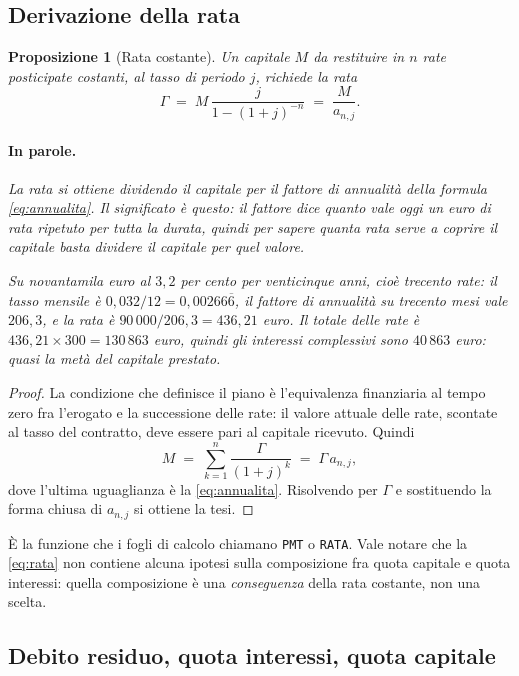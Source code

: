 \documentclass[11pt,a4paper]{article}
\theoremstyle{definition}
\theoremstyle{plain}
\newtheorem{proposizione}[definizione]{Proposizione}
\begin{document}
\subsection{Derivazione della rata}

\begin{proposizione}[Rata costante]
Un capitale $M$ da restituire in $n$ rate posticipate costanti, al tasso di periodo $j$, richiede la rata
\begin{equation}
\Gamma \;=\; M\,\frac{j}{1-(1+j)^{-n}} \;=\; \frac{M}{a_{n,j}} .
\label{eq:rata}
\end{equation}

\paragraph{In parole.} La rata si ottiene dividendo il capitale per il fattore di annualità della formula \eqref{eq:annualita}. Il significato è questo: il fattore dice quanto vale oggi un euro di rata ripetuto per tutta la durata, quindi per sapere quanta rata serve a coprire il capitale basta dividere il capitale per quel valore.

Su novantamila euro al $3{,}2$ per cento per venticinque anni, cioè trecento rate: il tasso mensile è $0{,}032/12 = 0{,}00266\overline{6}$, il fattore di annualità su trecento mesi vale $206{,}3$, e la rata è $90\,000/206{,}3 = 436{,}21$ euro. Il totale delle rate è $436{,}21 \times 300 = 130\,863$ euro, quindi gli interessi complessivi sono $40\,863$ euro: quasi la metà del capitale prestato.
\end{proposizione}

\begin{proof}
La condizione che definisce il piano è l'equivalenza finanziaria al tempo zero fra l'erogato e la successione delle rate: il valore attuale delle rate, scontate al tasso del contratto, deve essere pari al capitale ricevuto. Quindi
\[
M \;=\; \sum_{k=1}^{n} \frac{\Gamma}{(1+j)^k} \;=\; \Gamma\,a_{n,j},
\]
dove l'ultima uguaglianza è la \eqref{eq:annualita}. Risolvendo per $\Gamma$ e sostituendo la forma chiusa di $a_{n,j}$ si ottiene la tesi.
\end{proof}

È la funzione che i fogli di calcolo chiamano \texttt{PMT} o \texttt{RATA}. Vale notare che la \eqref{eq:rata} non contiene alcuna ipotesi sulla composizione fra quota capitale e quota interessi: quella composizione è una \emph{conseguenza} della rata costante, non una scelta.

\subsection{Debito residuo, quota interessi, quota capitale}
\end{document}
